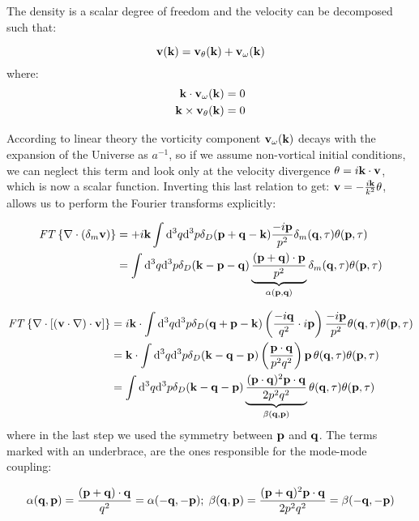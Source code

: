 The density is a scalar degree of freedom and the velocity can be
decomposed such that:

\begin{equation}
\mathbf{v}(\mathbf{k})=\mathbf{v}_{\theta}(\mathbf{k})+\mathbf{v{}_{\omega}}(\mathbf{k})
\end{equation}
where: 
\begin{align*}
\mathbf{k}\cdot\mathbf{v_{\omega}}(\mathbf{k}) & =0\\
\mathbf{k}\times\mathbf{v_{\theta}}(\mathbf{k}) & =0
\end{align*}


According to linear theory the vorticity component $\mathbf{v{}_{\omega}}(\mathbf{k})$
decays with the expansion of the Universe as $a^{-1}$, so if we assume
non-vortical initial conditions, we can neglect this term and look
only at the velocity divergence $\theta=i\mathbf{k}\cdot\mathbf{v}$, which
is now a scalar function. Inverting this last relation to get: $\mathbf{v}=-\frac{i\mathbf{k}}{k^{2}}\theta$,
allows us to perform the Fourier transforms explicitly:

\begin{align*}
\mathit{FT}\left\{ \nabla\cdot(\delta_{m}\mathbf{v})\right\}  & =+i\mathbf{k}\int\mathrm{d}^{3}q\mathrm{d}^{3}p\delta_{D}(\mathbf{p}+\mathbf{q}-\mathbf{k})\frac{-i\mathbf{p}}{p^{2}}\delta_{m}(\mathbf{q},\tau)\theta(\mathbf{p},\tau)\\
 & =\int\mathrm{d}^{3}q\mathrm{d}^{3}p\delta_{D}(\mathbf{k}-\mathbf{p}-\mathbf{q})\underbrace{\frac{\left(\mathbf{p}+\mathbf{q}\right)\cdot\mathbf{p}}{p^{2}}}_{\alpha(\mathbf{p},\mathbf{q})}\delta_{m}(\mathbf{q},\tau)\theta(\mathbf{p},\tau)
\end{align*}


\begin{align*}
\mathit{FT}\left\{ \nabla\cdot\left[\left(\mathbf{v}\cdot\nabla\right)\cdot\mathbf{v}\right]\right\}  & =i\mathbf{k}\cdot\int\mathrm{d}^{3}q\mathrm{d}^{3}p\delta_{D}(\mathbf{q}+\mathbf{p}-\mathbf{k})\left(\frac{-i\mathbf{q}}{q^{2}}\cdot i\mathbf{p}\right)\frac{-i\mathbf{p}}{p^{2}}\theta(\mathbf{q},\tau)\theta(\mathbf{p},\tau)\\
 & =\mathbf{k}\cdot\int\mathrm{d}^{3}q\mathrm{d}^{3}p\delta_{D}(\mathbf{k}-\mathbf{q}-\mathbf{p})\left(\frac{\mathbf{p}\cdot\mathbf{q}}{p^{2}q^{2}}\right)\mathbf{p}\,\theta(\mathbf{q},\tau)\theta(\mathbf{p},\tau)\\
 & =\int\mathrm{d}^{3}q\mathrm{d}^{3}p\delta_{D}(\mathbf{k}-\mathbf{q}-\mathbf{p})\underbrace{\frac{(\mathbf{p}\cdot\mathbf{q})^{2}\mathbf{p}\cdot\mathbf{q}}{2p^{2}q^{2}}}_{\beta(\mathbf{q},\mathbf{p})}\theta(\mathbf{q},\tau)\theta(\mathbf{p},\tau)
\end{align*}
where in the last step we used the symmetry between $\mathbf{p}$ and $\mathbf{q}$.
The terms marked with an underbrace, are the ones responsible for
the mode-mode coupling:

\begin{equation}
\alpha(\mathbf{q},\mathbf{p})=\frac{(\mathbf{p}+\mathbf{q})\cdot\mathbf{q}}{q^{2}}=\alpha(-\mathbf{q},-\mathbf{p});\;\beta(\mathbf{q},\mathbf{p})=\frac{(\mathbf{p}+\mathbf{q})^{2}\mathbf{p}\cdot\mathbf{q}}{2p^{2}q^{2}}=\beta(-\mathbf{q},-\mathbf{p})\label{eq:alpha-beta-func}
\end{equation}



